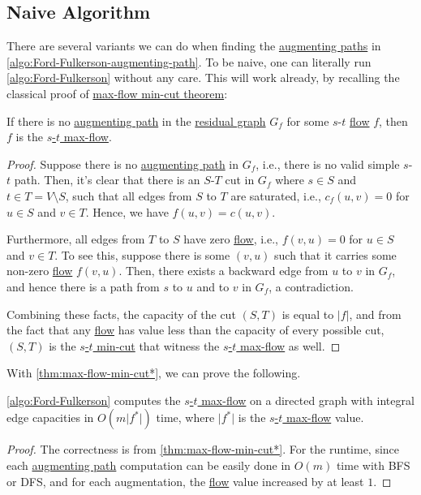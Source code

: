 \subsection{Naive Algorithm}
There are several variants we can do when finding the \hyperref[def:augmenting-path]{augmenting paths} in \autoref{algo:Ford-Fulkerson-augmenting-path}. To be naive, one can literally run \autoref{algo:Ford-Fulkerson} without any care. This will work already, by recalling the classical proof of \hyperref[thm:max-flow-min-cut]{max-flow min-cut theorem}:

\begin{theorem}\label{thm:max-flow-min-cut*}
	If there is no \hyperref[def:augmenting-path]{augmenting path} in the \hyperref[def:residual-graph]{residual graph} \(G_f\) for some \(s\)-\(t\) \hyperref[def:flow]{flow} \(f\), then \(f\) is the \hyperref[prb:s-t-max-flow]{\(s\)-\(t\) max-flow}.
\end{theorem}
\begin{proof}
	Suppose there is no \hyperref[def:augmenting-path]{augmenting path} in \(G_f\), i.e., there is no valid simple \(s\)-\(t\) path. Then, it's clear that there is an \(S\)-\(T\) cut in \(G_f\) where \(s \in S\) and \(t \in T = V \setminus S\), such that all edges from \(S\) to \(T\) are saturated, i.e., \(c_f(u, v) = 0\) for \(u \in S\) and \(v \in T\). Hence, we have \(f(u, v) = c(u, v)\).

	Furthermore, all edges from \(T\) to \(S\) have zero \hyperref[def:flow]{flow}, i.e., \(f(v, u) = 0\) for \(u \in S\) and \(v \in T\). To see this, suppose there is some \((v, u)\) such that it carries some non-zero \hyperref[def:flow]{flow} \(f(v, u)\). Then, there exists a backward edge from \(u\) to \(v\) in \(G_f\), and hence there is a path from \(s\) to \(u\) and to \(v\) in \(G_f\), a contradiction.

	Combining these facts, the capacity of the cut \((S, T)\) is equal to \(\lvert f \rvert \), and from the fact that any \hyperref[def:flow]{flow} has value less than the capacity of every possible cut, \((S, T)\) is the \hyperref[prb:s-t-min-cut]{\(s\)-\(t\) min-cut} that witness the \hyperref[prb:s-t-max-flow]{\(s\)-\(t\) max-flow} as well.
\end{proof}

With \autoref{thm:max-flow-min-cut*}, we can prove the following.

\begin{theorem}\label{thm:Ford-Fulkerson}
	\autoref{algo:Ford-Fulkerson} computes the \hyperref[prb:s-t-max-flow]{\(s\)-\(t\) max-flow} on a directed graph with integral edge capacities in \(O(m \lvert f^{\ast} \rvert)\) time, where \(\lvert f^{\ast} \rvert \) is the \hyperref[prb:s-t-max-flow]{\(s\)-\(t\) max-flow} value.
\end{theorem}
\begin{proof}
	The correctness is from \autoref{thm:max-flow-min-cut*}. For the runtime, since each \hyperref[def:augmenting-path]{augmenting path} computation can be easily done in \(O(m)\) time with BFS or DFS, and for each augmentation, the \hyperref[def:flow]{flow} value increased by at least \(1\).
\end{proof}

